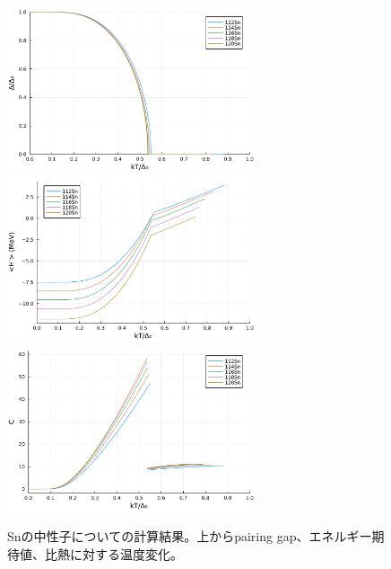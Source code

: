 \documentclass[a4paper]{jsreport}
\begin{document}
  \newpage
  \begin{figure}[H]
    \centering
    \includegraphics[width=0.65\textwidth]{main_fig/112d.pdf}
    \includegraphics[width=0.65\textwidth]{main_fig/112H.pdf}
    \includegraphics[width=0.65\textwidth]{main_fig/112C.pdf}
    \caption{Snの中性子についての計算結果。上からpairing gap、エネルギー期待値、比熱に対する温度変化。}
  \end{figure}
  \newpage
\end{document}
